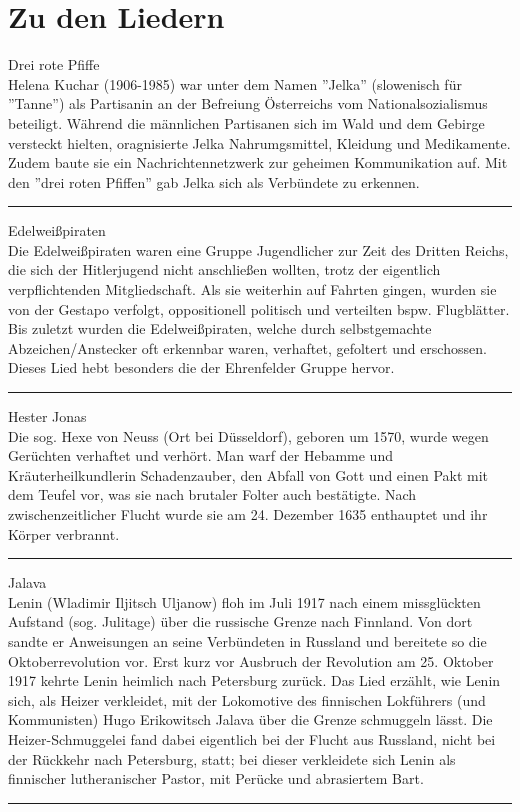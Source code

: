 \section*{Zu den Liedern}


Drei rote Pfiffe\\[+0.2em]
Helena Kuchar (1906-1985) war unter dem Namen ''Jelka'' (slowenisch für ''Tanne'') als Partisanin an der Befreiung Österreichs vom Nationalsozialismus beteiligt.
Während die männlichen Partisanen sich im Wald und dem Gebirge versteckt hielten, oragnisierte Jelka Nahrumgsmittel, Kleidung und Medikamente.
Zudem baute sie ein Nachrichtennetzwerk zur geheimen Kommunikation auf. Mit den ''drei roten Pfiffen'' gab Jelka sich als Verbündete zu erkennen.\\
\noindent\rule{\textwidth}{0.3pt}\vspace{0.5em}

Edelweißpiraten\\[+0.2em]
Die Edelweißpiraten waren eine Gruppe Jugendlicher zur Zeit des Dritten Reichs, die sich der Hitlerjugend nicht anschließen wollten, trotz der eigentlich verpflichtenden Mitgliedschaft.
Als sie weiterhin auf Fahrten gingen, wurden sie von der Gestapo verfolgt, oppositionell politisch und verteilten bspw. Flugblätter.
Bis zuletzt wurden die Edelweißpiraten, welche durch selbstgemachte Abzeichen/Anstecker oft erkennbar waren, verhaftet, gefoltert und erschossen.
Dieses Lied hebt besonders die der Ehrenfelder Gruppe hervor.\\
\noindent\rule{\textwidth}{0.3pt}\vspace{0.5em}

Hester Jonas\\[+0.2em]
Die sog. Hexe von Neuss (Ort bei Düsseldorf), geboren um 1570, wurde wegen Gerüchten verhaftet und verhört.
Man warf der Hebamme und Kräuterheilkundlerin Schadenzauber, den Abfall von Gott und einen Pakt mit dem Teufel vor, was sie nach brutaler Folter auch bestätigte.
Nach zwischenzeitlicher Flucht wurde sie am 24. Dezember 1635 enthauptet und ihr Körper verbrannt.\\
\noindent\rule{\textwidth}{0.3pt}\vspace{0.5em}

Jalava\\[+0.2em]
Lenin (Wladimir Iljitsch Uljanow) floh im Juli 1917 nach einem missglückten Aufstand (sog. Julitage) über die russische Grenze nach Finnland.
Von dort sandte er Anweisungen an seine Verbündeten in Russland und bereitete so die Oktoberrevolution vor.
Erst kurz vor Ausbruch der Revolution am 25. Oktober 1917 kehrte Lenin heimlich nach Petersburg zurück.
Das Lied erzählt, wie Lenin sich, als Heizer verkleidet, mit der Lokomotive des finnischen Lokführers (und Kommunisten) Hugo Erikowitsch Jalava über die Grenze schmuggeln lässt.
Die Heizer-Schmuggelei fand dabei eigentlich bei der Flucht aus Russland, nicht bei der Rückkehr nach Petersburg, statt; bei dieser verkleidete sich Lenin als finnischer lutheranischer Pastor, mit Perücke und abrasiertem Bart.\\
\noindent\rule{\textwidth}{0.3pt}\vspace{0.5em}